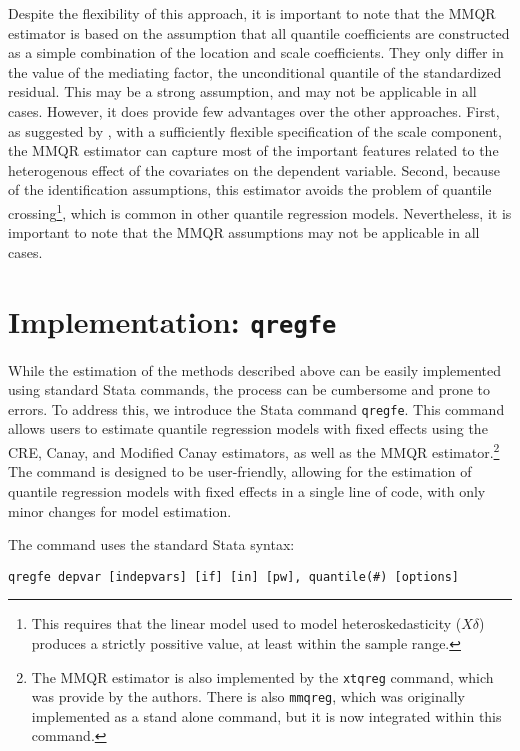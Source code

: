 \documentclass[bib]{statapress}
\begin{document}
Despite the flexibility of this approach, it is important to note that
the MMQR estimator is based on the assumption that all quantile
coefficients are constructed as a simple combination of the location and
scale coefficients. They only differ in the value of the mediating
factor, the unconditional quantile of the standardized residual. This
may be a strong assumption, and may not be applicable in all cases.
However, it does provide few advantages over the other approaches.
First, as suggested by \citet{mss2019}, with a sufficiently flexible
specification of the scale component, the MMQR estimator can capture
most of the important features related to the heterogenous effect of the
covariates on the dependent variable. Second, because of the
identification assumptions, this estimator avoids the problem of
quantile crossing\footnote{This requires that the linear model used to
  model heteroskedasticity (\(X\delta\)) produces a strictly possitive
  value, at least within the sample range.}, which is common in other
quantile regression models. Nevertheless, it is important to note that
the MMQR assumptions may not be applicable in all cases.

\section{\texorpdfstring{Implementation:
\texttt{qregfe}}{Implementation: qregfe}}\label{sec-implementation}

While the estimation of the methods described above can be easily
implemented using standard Stata commands, the process can be cumbersome
and prone to errors. To address this, we introduce the Stata command
\texttt{qregfe}. This command allows users to estimate quantile
regression models with fixed effects using the CRE, Canay, and Modified
Canay estimators, as well as the MMQR estimator.\footnote{The MMQR
  estimator is also implemented by the \texttt{xtqreg} command, which
  was provide by the authors. There is also \texttt{mmqreg}, which was
  originally implemented as a stand alone command, but it is now
  integrated within this command.} The command is designed to be
user-friendly, allowing for the estimation of quantile regression models
with fixed effects in a single line of code, with only minor changes for
model estimation.

The command uses the standard Stata syntax:

\begin{verbatim}
qregfe depvar [indepvars] [if] [in] [pw], quantile(#) [options]
\end{verbatim}
\end{document}
